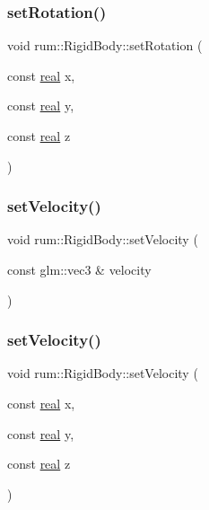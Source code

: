 \mbox{\label{classrum_1_1_rigid_body_aa0156ccce8351de3e869dd19117e014a}} 
\subsubsection{\texorpdfstring{set\+Rotation()}{setRotation()}\hspace{0.1cm}{\footnotesize\ttfamily [2/2]}}
{\footnotesize\ttfamily void rum\+::\+Rigid\+Body\+::set\+Rotation (\begin{DoxyParamCaption}\item[{const \hyperlink{namespacerum_a7e8cca23573d5eaead0f138cbaa4862c}{real}}]{x,  }\item[{const \hyperlink{namespacerum_a7e8cca23573d5eaead0f138cbaa4862c}{real}}]{y,  }\item[{const \hyperlink{namespacerum_a7e8cca23573d5eaead0f138cbaa4862c}{real}}]{z }\end{DoxyParamCaption})}

\mbox{\label{classrum_1_1_rigid_body_a807a0309fef97be32db6f1e981e2f029}} 
\subsubsection{\texorpdfstring{set\+Velocity()}{setVelocity()}\hspace{0.1cm}{\footnotesize\ttfamily [1/2]}}
{\footnotesize\ttfamily void rum\+::\+Rigid\+Body\+::set\+Velocity (\begin{DoxyParamCaption}\item[{const glm\+::vec3 \&}]{velocity }\end{DoxyParamCaption})}

\mbox{\label{classrum_1_1_rigid_body_a9c0d7b85a4fa9fcd4fa4a7ab3e309234}} 
\subsubsection{\texorpdfstring{set\+Velocity()}{setVelocity()}\hspace{0.1cm}{\footnotesize\ttfamily [2/2]}}
{\footnotesize\ttfamily void rum\+::\+Rigid\+Body\+::set\+Velocity (\begin{DoxyParamCaption}\item[{const \hyperlink{namespacerum_a7e8cca23573d5eaead0f138cbaa4862c}{real}}]{x,  }\item[{const \hyperlink{namespacerum_a7e8cca23573d5eaead0f138cbaa4862c}{real}}]{y,  }\item[{const \hyperlink{namespacerum_a7e8cca23573d5eaead0f138cbaa4862c}{real}}]{z }\end{DoxyParamCaption})}

